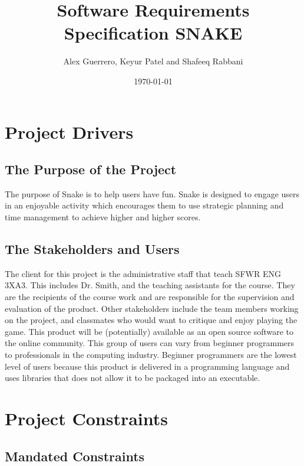 \documentclass[12pt]{article}
\begin{document}
\title{Software Requirements Specification
SNAKE
} 
\author{Alex Guerrero, Keyur Patel and Shafeeq Rabbani}
\date{\today}
	
\maketitle

\tableofcontents
\newpage


\section{Project Drivers}

\subsection{The Purpose of the Project}

		The purpose of Snake is to help users have fun. Snake is designed to engage users in an enjoyable activity which encourages them to use strategic planning and time management to achieve higher and higher scores.
		
\subsection{The Stakeholders and Users} 

The client for this project is the administrative staff that teach SFWR ENG 3XA3. This includes Dr. Smith, and the teaching assistants for the course. They are the recipients of the course work and are responsible for the supervision and evaluation of the product. Other stakeholders include the team members working on the project, and classmates who would want to critique and enjoy playing the game. This product will be (potentially) available as an open source software to the online community. This group of users can vary from beginner programmers to professionals in the computing industry. Beginner programmers are the lowest level of users because this product is delivered in a programming language and uses libraries that does not allow it to be packaged into an executable.

\section{Project Constraints}

\subsection{Mandated Constraints}
\end{document}
